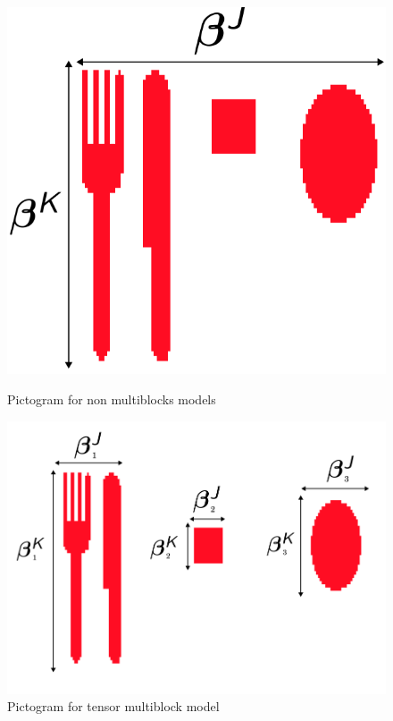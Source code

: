 \documentclass{beamer}
\begin{document}
\begin{frame}
    \begin{figure}
        \centering
        \begin{minipage}{0.45\textwidth}
            \centering
            \includegraphics[scale = 0.17]{images/3_picto.png}
            \caption{Pictogram for non multiblocks models}
        \end{minipage}
        \begin{minipage}{0.45\textwidth}
            \centering
        \includegraphics[scale = 0.17]{images/3_picto_sepa.png}
        \caption{Pictogram for tensor multiblock model}
    \end{minipage}
    \end{figure}

\end{frame}
\end{document}
